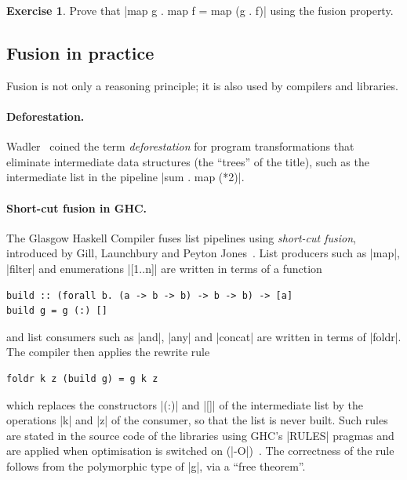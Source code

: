 \documentclass[a4paper,11pt, oneside,titlepage=false]{scrbook}
\theoremstyle{plain}
\theoremstyle{definition}
\newtheorem{exer}[thm]{Exercise}
\begin{document}
\begin{exer}
  Prove that |map g . map f = map (g . f)| using the fusion property.
\end{exer}


\subsection{Fusion in practice}\label{sec:fusion-practice}

Fusion is not only a reasoning principle; it is also used by compilers and libraries.

\paragraph{Deforestation.}
Wadler~\cite{wadler-deforestation-1990} coined the term \emph{deforestation} for program transformations that eliminate intermediate data structures (the ``trees'' of the title), such as the intermediate list in the pipeline |sum . map (*2)|.

\paragraph{Short-cut fusion in GHC.}
The Glasgow Haskell Compiler fuses list pipelines using \emph{short-cut fusion}, introduced by Gill, Launchbury and Peyton Jones~\cite{gill-launchbury-peytonjones-1993}.
List producers such as |map|, |filter| and enumerations |[1..n]| are written in terms of a function
\begin{lstlisting}
build :: (forall b. (a -> b -> b) -> b -> b) -> [a]
build g = g (:) []
\end{lstlisting}
and list consumers such as |and|, |any| and |concat| are written in terms of |foldr|.
The compiler then applies the rewrite rule
\begin{lstlisting}
foldr k z (build g) = g k z
\end{lstlisting}
which replaces the constructors |(:)| and |[]| of the intermediate list by the operations |k| and |z| of the consumer, so that the list is never built.
Such rules are stated in the source code of the libraries using GHC's |RULES| pragmas and are applied when optimisation is switched on (|-O|)~\cite{peytonjones-tolmach-hoare-2001}.
The correctness of the rule follows from the polymorphic type of |g|, via a ``free theorem''.
\end{document}
